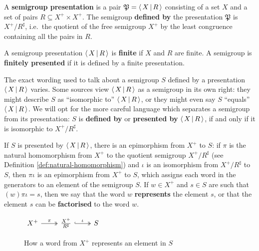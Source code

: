 \begin{definition}
  \label{def:presentation}
  A \textbf{semigroup presentation} is a pair $\mathfrak{P} = \left\langle \, X \, \middle| \, R \, \right\rangle$
  consisting of a set $X$ and a set of pairs $R \subseteq X^+ \times X^+$.  The
  semigroup \textbf{defined by} the presentation $\mathfrak{P}$ is
  $X^+ / R^\sharp$, i.e.~the quotient of the free semigroup $X^+$ by the least
  congruence containing all the pairs in $R$.
\end{definition}

\begin{definition}
  \label{def:finite-presentation}
  A semigroup presentation $\left\langle \, X \, \middle| \, R \, \right\rangle$ is \textbf{finite} if $X$ and $R$ are
  finite.  A semigroup is \textbf{finitely presented} if it is defined by a
  finite presentation.
\end{definition}

The exact wording used to talk about a semigroup $S$ defined by a presentation
$\left\langle \, X \, \middle| \, R \, \right\rangle$ varies.  Some sources view $\left\langle \, X \, \middle| \, R \, \right\rangle$ as a semigroup in its own
right: they might describe $S$ as ``isomorphic to'' $\left\langle \, X \, \middle| \, R \, \right\rangle$, or they might
even say $S$ ``equals'' $\left\langle \, X \, \middle| \, R \, \right\rangle$.  We will opt for the more careful language
which separates a semigroup from its presentation: $S$ is \textbf{defined by}  or
\textbf{presented by}  $\left\langle \, X \, \middle| \, R \, \right\rangle$, if and only if it is isomorphic to
$X^+ / R^\sharp$.

If $S$ is presented by $\left\langle \, X \, \middle| \, R \, \right\rangle$, there is an epimorphism from $X^+$ to $S$:
if $\pi$ is the natural homomorphism from $X^+$ to the quotient semigroup
$X^+ / R^\sharp$ (see Definition \ref{def:natural-homomorphism}) and $\iota$ is
an isomorphism from $X^+ / R^\sharp$ to $S$, then $\pi\iota$ is an epimorphism
from $X^+$ to $S$, which assigns each word in the generators to an element of
the semigroup $S$.  If $w \in X^+$ and $s \in S$ are such that
$(w)\pi\iota = s$, then we say that the word $w$ \textbf{represents}  the element
$s$, or that the element $s$ can be \textbf{factorised}  to the word $w$.

\begin{figure}[ht]
  \centering
  $
  \begin{tikzcd}
    X^+ \ar[r, two heads, "\pi"] &
    \frac{X^+}{R^\sharp} \ar[r, two heads, hook, "\iota"] &
    S
  \end{tikzcd}
  $
  \caption[How a word represents a finitely presented semigroup element]{How a
    word from $X^+$ represents an element in $S$}
  \label{fig:word-represents-element}
\end{figure}

